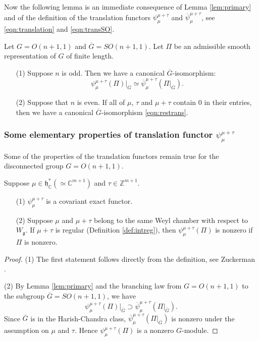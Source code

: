 Now the following lemma is an immediate consequence
 of Lemma \ref{lem:primary}
 and of the definition of the translation functors
 $\psi_{\mu}^{\mu+\tau}$ and $\overline \psi_{\mu}^{\mu+\tau}$, 
 see \eqref{eqn:translation} and \eqref{eqn:transSO}. 
\begin{lemma}
\label{lem:Xtrans}
Let $G=O(n+1,1)$ and $\overline G=SO(n+1,1)$.  
Let $\Pi$ be an admissible smooth representation of $G$
 of finite length.  
\begin{enumerate}
\item[{\rm{(1)}}]
Suppose $n$ is odd.  
Then we have a canonical $\overline G$-isomorphism:
\begin{equation}
\label{eqn:restrans}
\psi_{\mu}^{\mu+\tau}(\Pi)|_{\overline G}
\simeq
\overline \psi_{\mu}^{\mu+\tau}(\Pi|_{\overline G}).  
\end{equation}
\item[{\rm{(2)}}]
Suppose that $n$ is even.  
If all of $\mu$, $\tau$ and $\mu+\tau$ contain 0 in their entries,
 then we have a canonical $\overline G$-isomorphism
 \eqref{eqn:restrans}.  
\end{enumerate}
\end{lemma}

\subsubsection{Some elementary properties
 of translation functor $\psi_{\mu}^{\mu+\tau}$}
Some of the properties of the translation functors remain true
 for the disconnected group $G=O(n+1,1)$.  
\begin{proposition}
\label{prop:transfunct}
Suppose $\mu \in {\mathfrak{h}}_{\mathbb{C}}^{\ast} (\simeq {\mathbb{C}}^{m+1})$
 and $\tau \in {\mathbb{Z}}^{m+1}$.  
\begin{enumerate}
\item[{\rm{(1)}}]
$\psi_{\mu}^{\mu+\tau}$ is a covariant exact functor.  
\item[{\rm{(2)}}]
Suppose $\mu$ and $\mu+\tau$ belong to the same Weyl chamber
 with respect to $W_{\mathfrak{g}}$.  
If $\mu+\tau$ is regular 
 (Definition \ref{def:intreg}), 
 then $\psi_{\mu}^{\mu+\tau}(\Pi)$ is nonzero 
 if $\Pi$ is nonzero.  
\end{enumerate}
\end{proposition}

\begin{proof}
(1)\enspace
The first statement follows directly from  the definition,
 see Zuckerman \cite{Zuckerman}.  
\par\noindent
(2)\enspace
By Lemma \ref{lem:primary} and the branching law from $G=O(n+1,1)$
 to the subgroup $\overline G=SO(n+1,1)$, 
 we have
\[
 \psi_{\mu}^{\mu+\tau}(\Pi)|_{\overline G}
  \supset 
  \overline \psi_{\mu}^{\mu+\tau}(\Pi|_{\overline G}).  
\]
Since ${\overline G}$ is in the Harish-Chandra class,
 $\overline \psi_{\mu}^{\mu+\tau}(\Pi|_{\overline G})$
 is nonzero under the assumption
 on $\mu$ and $\tau$.  
Hence $\psi_{\mu}^{\mu+\tau}(\Pi)$ is a nonzero $G$-module.  
\end{proof}

